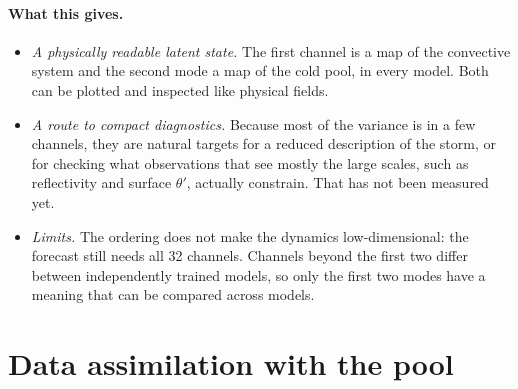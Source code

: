 \documentclass[11pt]{article}
\begin{document}
\paragraph{What this gives.}
\begin{itemize}
\item \emph{A physically readable latent state.} The first channel is a map of the convective system and the second mode a map of the cold pool, in every model. Both can be plotted and inspected like physical fields.
\item \emph{A route to compact diagnostics.} Because most of the variance is in a few channels, they are natural targets for a reduced description of the storm, or for checking what observations that see mostly the large scales, such as reflectivity and surface $\theta'$, actually constrain. That has not been measured yet.
\item \emph{Limits.} The ordering does not make the dynamics low-dimensional: the forecast still needs all 32 channels. Channels beyond the first two differ between independently trained models, so only the first two modes have a meaning that can be compared across models.
\end{itemize}

\FloatBarrier
\section{Data assimilation with the pool}
\end{document}
